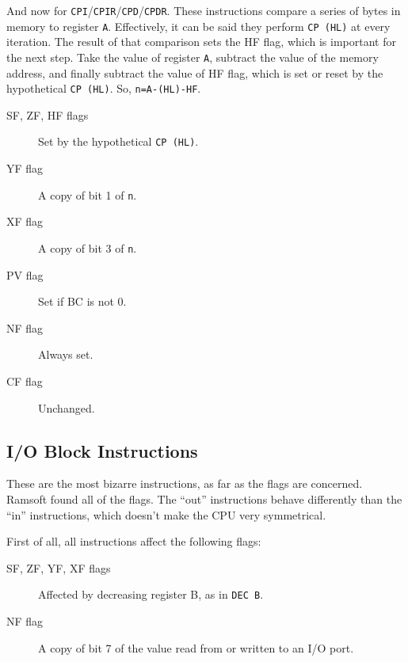 And now for {\tt CPI}/{\tt CPIR}/{\tt CPD}/{\tt CPDR}. These instructions compare a series of bytes in memory to register {\tt A}. Effectively, it can be said they perform {\tt CP (HL)} at every iteration. The result of that comparison sets the HF flag, which is important for the next step. Take the value of register {\tt A}, subtract the value of the memory address, and finally subtract the value of HF flag, which is set or reset by the hypothetical {\tt CP (HL)}. So, {\tt n=A-(HL)-HF}.

\begin{description}

	\item[SF, ZF, HF flags]
	Set by the hypothetical {\tt CP (HL)}.

	\item[YF flag]
	A copy of bit 1 of {\tt n}.

	\item[XF flag]
	A copy of bit 3 of {\tt n}.

	\item[PV flag]
	Set if BC is not 0.

	\item[NF flag]
	Always set.

	\item[CF flag]
	Unchanged.

\end{description}


\subsection{I/O Block Instructions}
\label{z80_undocumented_instructions_io_block}

These are the most bizarre instructions, as far as the flags are concerned. Ramsoft found all of the flags. The ``out'' instructions behave differently than the ``in'' instructions, which doesn't make the CPU very symmetrical. 

First of all, all instructions affect the following flags:

\begin{description}

	\item[SF, ZF, YF, XF flags]
	Affected by decreasing register B, as in {\tt DEC B}.

	\item[NF flag]
	A copy of bit 7 of the value read from or written to an I/O port.

\end{description}

